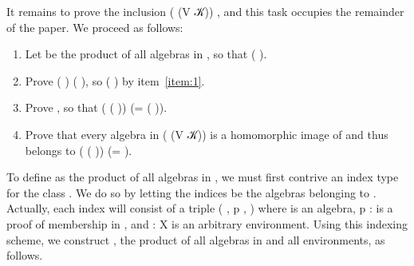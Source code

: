 It remains to prove the inclusion  ( (V 𝒦))   ,
and this task occupies the remainder of the paper.  We proceed as follows:

\begin{enumerate}
\item \label{item:1} Let  be the product of all algebras in  , so that    ( ).
\item Prove  ( )   ( ), so    ( ) by item~\ref{item:1}.
\item Prove   , so that    ( ( )) (=  ( )).
\item Prove that every algebra in  ( (V 𝒦)) is a homomorphic image of
 and thus belongs to  ( ( )) (=  ).
\end{enumerate}

To define  as the product of all algebras in  , we must first contrive
an index type for the class  .  We do so by letting the indices be the algebras
belonging to . Actually, each index will consist of a triple ( , \ab p ,
) where  is an algebra, \ab p :     is a proof of membership in ,
and  : \ab X   is an arbitrary environment.
Using this indexing scheme, we construct , the product of all algebras in 
and all environments, as follows.

